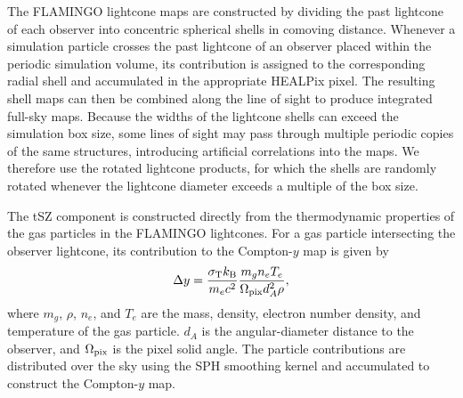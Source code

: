\documentclass[aps,prd,twocolumn,superscriptaddress,nofootinbib,floatfix]{revtex4-2}
\newcommand{\LX}[1]{{\color{red} #1}}
\begin{document}
The FLAMINGO lightcone maps are constructed by dividing the past lightcone of each observer into concentric spherical shells in comoving distance. Whenever a simulation particle crosses the past lightcone of an observer placed within the periodic simulation volume, its contribution is assigned to the corresponding radial shell and accumulated in the appropriate HEALPix pixel. The resulting shell maps can then be combined along the line of sight to produce integrated full-sky maps. Because the widths of the lightcone shells can exceed the simulation box size, some lines of sight may pass through multiple periodic copies of the same structures, introducing artificial correlations into the maps. We therefore use the rotated lightcone products, for which the shells are randomly rotated whenever the lightcone diameter exceeds a multiple of the box size. 


The tSZ component is constructed directly from the thermodynamic properties of the gas particles in the FLAMINGO lightcones. For a gas particle intersecting the observer lightcone, its contribution to the Compton-\(y\) map is given by
\begin{equation}
\Delta y
=
\frac{\sigma_{\rm T} k_{\rm B}}{m_e c^2}
\frac{m_g n_e T_e}
{\Omega_{\rm pix} d_A^2 \rho},
\label{eq:flamingo_particle_y}
\end{equation}
where $m_g$, $\rho$, $n_e$, and $T_e$ are the mass, density, electron number density, and temperature of the gas particle. $d_A$ is the angular-diameter distance to the observer, and $\Omega_{\rm pix}$ is the pixel solid angle. The particle contributions are distributed over the sky using the SPH smoothing kernel and accumulated to construct the Compton-$y$ map.
\end{document}
